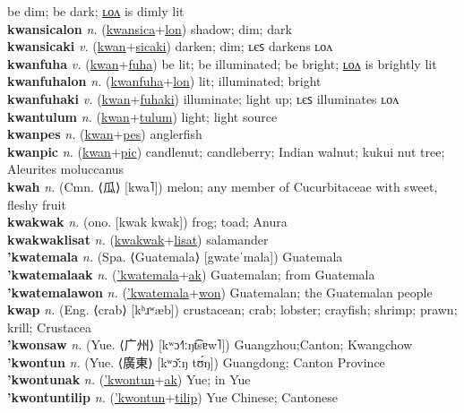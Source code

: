be dim; be dark; \hyperref[kwansicalon]{ʟᴏᴧ} is dimly lit \label{kwansica} \\
\textbf{kwansicalon} \textit{n.} (\hyperref[kwansica]{kwansica}+\hyperref[lon]{lon})
shadow; dim; dark \label{kwansicalon} \\
\textbf{kwansicaki} \textit{v.} (\hyperref[kwan]{kwan}+\hyperref[sicaki]{sicaki})
darken; dim; ʟєꜱ darkens ʟᴏᴧ \label{kwansicaki} \\
\textbf{kwanfuha} \textit{v.} (\hyperref[kwan]{kwan}+\hyperref[fuha]{fuha})
be lit; be illuminated; be bright; \hyperref[kwanfuhalon]{ʟᴏᴧ} is brightly lit \label{kwanfuha} \\
\textbf{kwanfuhalon} \textit{n.} (\hyperref[kwanfuha]{kwanfuha}+\hyperref[lon]{lon})
lit; illuminated; bright \label{kwanfuhalon} \\
\textbf{kwanfuhaki} \textit{v.} (\hyperref[kwan]{kwan}+\hyperref[fuhaki]{fuhaki})
illuminate; light up; ʟєꜱ illuminates ʟᴏᴧ \label{kwanfuhaki} \\
\textbf{kwantulum} \textit{n.} (\hyperref[kwan]{kwan}+\hyperref[tulum]{tulum})
light; light source \label{kwantulum} \\
\textbf{kwanpes} \textit{n.} (\hyperref[kwan]{kwan}+\hyperref[pes]{pes})
anglerfish \label{kwanpes} \\
\textbf{kwanpic} \textit{n.} (\hyperref[kwan]{kwan}+\hyperref[pic]{pic})
candlenut; candleberry; Indian walnut; kukui nut tree; Aleurites moluccanus \label{kwanpic} \\
\textbf{kwah} \textit{n.} (Cmn. ⟨瓜⟩ [kwa˥])
melon; any member of Cucurbitaceae with sweet, fleshy fruit \label{kwah} \\
\textbf{kwakwak} \textit{n.} (ono. [kwak kwak])
frog; toad; Anura \label{kwakwak} \\
\textbf{kwakwaklisat} \textit{n.} (\hyperref[kwakwak]{kwakwak}+\hyperref[lisat]{lisat})
salamander \label{kwakwaklisat} \\
\textbf{'kwatemala} \textit{n.} (Spa. ⟨Guatemala⟩ [gwateˈmala])
Guatemala \label{'kwatemala} \\
\textbf{'kwatemalaak} \textit{n.} (\hyperref['kwatemala]{'kwatemala}+\hyperref[ak]{ak})
Guatemalan; from Guatemala \label{'kwatemalaak} \\
\textbf{'kwatemalawon} \textit{n.} (\hyperref['kwatemala]{'kwatemala}+\hyperref[won]{won})
Guatemalan; the Guatemalan people \label{'kwatemalawon} \\
\textbf{kwap} \textit{n.} (Eng. ⟨crab⟩ [kʰɹʷæb])
crustacean; crab; lobster; crayfish; shrimp; prawn; krill; Crustacea \label{kwap} \\
\textbf{'kwonsaw} \textit{n.} (Yue. ⟨广州⟩ [kʷɔ˧˥ːŋt͡sɐw˥])
Guangzhou;Canton; Kwangchow \label{'kwonsaw} \\
\textbf{'kwontun} \textit{n.} (Yue. ⟨廣東⟩ [kʷɔ̌ːŋ tʊ́ŋ])
Guangdong; Canton Province \label{'kwontun} \\
\textbf{'kwontunak} \textit{n.} (\hyperref['kwontun]{'kwontun}+\hyperref[ak]{ak})
Yue; in Yue \label{'kwontunak} \\
\textbf{'kwontuntilip} \textit{n.} (\hyperref['kwontun]{'kwontun}+\hyperref[tilip]{tilip})
Yue Chinese; Cantonese \label{'kwontuntilip} \\

